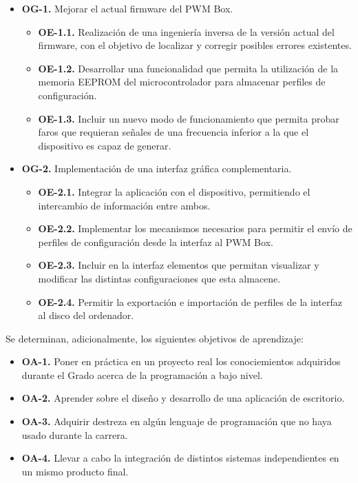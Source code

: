 \begin{itemize}
    \item\textbf{OG-1.} Mejorar el actual firmware del PWM Box.
    \begin{itemize}
        \item\textbf{OE-1.1.} Realización de una ingeniería inversa de la versión actual del firmware, con el objetivo de localizar y corregir posibles errores existentes.
        \item\textbf{OE-1.2.} Desarrollar una funcionalidad que permita la utilización de la memoria EEPROM del microcontrolador para almacenar perfiles de configuración.
        \item\textbf{OE-1.3.} Incluir un nuevo modo de funcionamiento que permita probar faros que requieran señales de una frecuencia inferior a la que el dispositivo es capaz de generar.
    \end{itemize}
    \item\textbf{OG-2.} Implementación de una interfaz gráfica complementaria.
    \begin{itemize}
        \item\textbf{OE-2.1.} Integrar la aplicación con el dispositivo, permitiendo el intercambio de información entre ambos.
        \item\textbf{OE-2.2.} Implementar los mecanismos necesarios para permitir el envío de perfiles de configuración desde la interfaz al PWM Box.
        \item\textbf{OE-2.3.} Incluir en la interfaz elementos que permitan visualizar y modificar las distintas configuraciones que esta almacene.
        \item\textbf{OE-2.4.} Permitir la exportación e importación de perfiles de la interfaz al disco del ordenador.
    \end{itemize}
\end{itemize}

Se determinan, adicionalmente, los siguientes objetivos de aprendizaje:

\begin{itemize}
    \item\textbf{OA-1.} Poner en práctica en un proyecto real los conociemientos adquiridos durante el Grado acerca de la programación a bajo nivel.
    \item\textbf{OA-2.} Aprender sobre el diseño y desarrollo de una aplicación de escritorio.
    \item\textbf{OA-3.} Adquirir destreza en algún lenguaje de programación que no haya usado durante la carrera.
    \item\textbf{OA-4.} Llevar a cabo la integración de distintos sistemas independientes en un mismo producto final.
\end{itemize}

